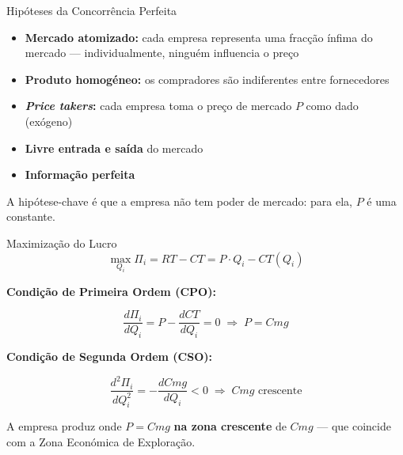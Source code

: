 \documentclass[
  ignorenonframetext,
  handout]{beamer}
\providecommand{\tightlist}{%
  \setlength{\itemsep}{0pt}\setlength{\parskip}{0pt}}
\begin{document}
\begin{frame}{Hipóteses da Concorrência Perfeita}
\label{hipuxf3teses-da-concorruxeancia-perfeita}
\begin{itemize}
\tightlist
\item
  \textbf{Mercado atomizado:} cada empresa representa uma fracção ínfima
  do mercado --- individualmente, ninguém influencia o preço
\item
  \textbf{Produto homogéneo:} os compradores são indiferentes entre
  fornecedores
\item
  \textbf{\emph{Price takers}:} cada empresa toma o preço de mercado
  \(P\) como dado (exógeno)
\item
  \textbf{Livre entrada e saída} do mercado
\item
  \textbf{Informação perfeita}
\end{itemize}

\begin{tcolorbox}[enhanced jigsaw, colback=white, colframe=quarto-callout-important-color-frame, arc=.35mm, leftrule=.75mm, rightrule=.15mm, opacityback=0, breakable, toprule=.15mm, bottomrule=.15mm, left=2mm]

A hipótese-chave é que a empresa não tem poder de mercado: para ela,
\(P\) é uma constante.

\end{tcolorbox}
\end{frame}

\begin{frame}{Maximização do Lucro}
\label{maximizauxe7uxe3o-do-lucro}
\[\max_{Q_i} \Pi_i = RT - CT = P \cdot Q_i - CT(Q_i)\]

\textbf{Condição de Primeira Ordem (CPO):}

\[\frac{d\Pi_i}{dQ_i} = P - \frac{dCT}{dQ_i} = 0 \;\Rightarrow\; \boxed{P = Cmg}\]

\textbf{Condição de Segunda Ordem (CSO):}

\[\frac{d^2\Pi_i}{dQ_i^2} = -\frac{dCmg}{dQ_i} < 0 \;\Rightarrow\; Cmg \text{ crescente}\]

A empresa produz onde \(P = Cmg\) \textbf{na zona crescente} de \(Cmg\)
--- que coincide com a Zona Económica de Exploração.
\end{frame}
\end{document}
